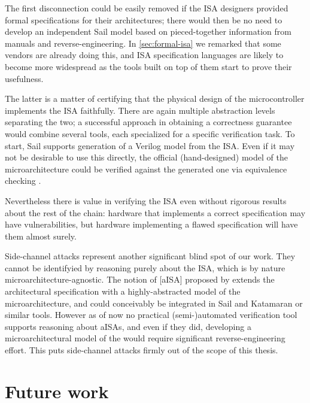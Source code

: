 The first disconnection could be easily removed if the ISA designers provided formal specifications for their architectures; there would then be no need to develop an independent Sail model based on pieced-together information from manuals and reverse-engineering. In \cref{sec:formal-isa} we remarked that some vendors are already doing this, and ISA specification languages are likely to become more widespread as the tools built on top of them start to prove their usefulness.

The latter is a matter of certifying that the physical design of the microcontroller implements the ISA faithfully. There are again multiple abstraction levels separating the two; a successful approach in obtaining a correctness guarantee would combine several tools, each specialized for a specific verification task. To start, Sail supports generation of a Verilog model from the ISA. Even if it may not be desirable to use this directly, the official (hand-designed) model of the microarchitecture could be verified against the generated one via equivalence checking \cite{Reid2016a}.

Nevertheless there is value in verifying the ISA even without rigorous results about the rest of the chain: hardware that implements a correct specification may have vulnerabilities, but hardware implementing a flawed specification will have them almost surely.

Side-channel attacks represent another significant blind spot of our work. They cannot be identifyied by reasoning purely about the ISA, which is by nature microarchitecture-agnostic. The notion of [aISA] proposed by \cite{Ge2018} extends the architectural specification with a highly-abstracted model of the microarchitecture, and could conceivably be integrated in Sail and Katamaran or similar tools. However as of now no practical (semi-)automated verification tool supports reasoning about aISAs, and even if they did, developing a microarchitectural model of the \msp would require significant reverse-engineering effort. This puts side-channel attacks firmly out of the scope of this thesis.

\section{Future work}

